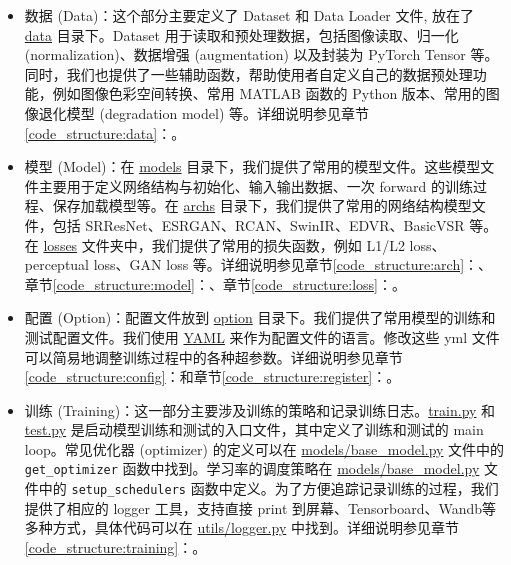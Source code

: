 \documentclass[../main.tex]{subfiles}
\begin{document}
\begin{itemize}
    \item 数据 (Data)：这个部分主要定义了 Dataset 和 Data Loader 文件, 放在了 \href{https://github.com/XPixelGroup/BasicSR/tree/master/basicsr/data}{data} 目录下。Dataset 用于读取和预处理数据，包括图像读取、归一化 (normalization)、数据增强 (augmentation) 以及封装为 PyTorch Tensor 等。同时，我们也提供了一些辅助函数，帮助使用者自定义自己的数据预处理功能，例如图像色彩空间转换、常用 MATLAB 函数的 Python 版本、常用的图像退化模型 (degradation model) 等。详细说明参见章节\ref{code_structure:data}：。

    \item 模型 (Model)：在 \href{https://github.com/XPixelGroup/BasicSR/tree/master/basicsr/models}{models} 目录下，我们提供了常用的模型文件。这些模型文件主要用于定义网络结构与初始化、输入输出数据、一次 forward 的训练过程、保存加载模型等。在 \href{https://github.com/XPixelGroup/BasicSR/tree/master/basicsr/archs}{archs} 目录下，我们提供了常用的网络结构模型文件，包括 SRResNet、ESRGAN、RCAN、SwinIR、EDVR、BasicVSR 等。在 \href{https://github.com/XPixelGroup/BasicSR/tree/master/basicsr/losses}{losses} 文件夹中，我们提供了常用的损失函数，例如 L1/L2 loss、perceptual loss、GAN loss 等。详细说明参见章节\ref{code_structure:arch}：、章节\ref{code_structure:model}：、章节\ref{code_structure:loss}：。

    \item 配置 (Option)：配置文件放到 \href{https://github.com/XPixelGroup/BasicSR/tree/master/options}{option} 目录下。我们提供了常用模型的训练和测试配置文件。我们使用 \href{https://yaml.org/}{YAML} 来作为配置文件的语言。修改这些 yml 文件可以简易地调整训练过程中的各种超参数。详细说明参见章节\ref{code_structure:config}：和章节\ref{code_structure:register}：。

    \item 训练 (Training)：这一部分主要涉及训练的策略和记录训练日志。\href{https://github.com/XPixelGroup/BasicSR/blob/master/basicsr/train.py}{train.py} 和 \href{https://github.com/XPixelGroup/BasicSR/blob/master/basicsr/test.py}{test.py} 是启动模型训练和测试的入口文件，其中定义了训练和测试的 main loop。常见优化器 (optimizer) 的定义可以在 \href{https://github.com/XPixelGroup/BasicSR/blob/master/basicsr/models/base_model.py}{models/base\_model.py} 文件中的 \texttt{get\_optimizer} 函数中找到。学习率的调度策略在 \href{https://github.com/XPixelGroup/BasicSR/blob/master/basicsr/models/base_model.py}{models/base\_model.py}  文件中的 \texttt{setup\_schedulers} 函数中定义。为了方便追踪记录训练的过程，我们提供了相应的 logger 工具，支持直接 print 到屏幕、Tensorboard、Wandb等多种方式，具体代码可以在 \href{https://github.com/XPixelGroup/BasicSR/blob/master/basicsr/utils/logger.py}{utils/logger.py} 中找到。详细说明参见章节\ref{code_structure:training}：。


\end{itemize}
\end{document}
